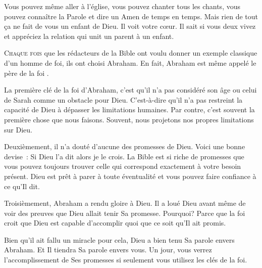 Vous pouvez même aller à l'église, vous pouvez chanter tous les chants,
 vous pouvez connaître la Parole et dire un \og Amen \fg{} de temps en temps.
 Mais rien de tout ça ne fait de vous un enfant de Dieu.
 Il voit votre c\oe{}ur. Il sait si vous deux vivez et appréciez
 la relation qui unit un parent à un enfant.

\dvrule






\lettrine{C}{haque fois} que les rédacteurs de la Bible ont voulu
 donner un exemple classique d'un homme de foi, ils ont choisi Abraham.
 En fait, Abraham est même appelé \og le père de la foi \fg{}.

La première clé de la foi d'Abraham, c'est qu'il n'a pas considéré
 son âge ou celui de Sarah comme un obstacle pour Dieu.
 C'est-à-dire qu'il n'a pas restreint la capacité de Dieu
 à dépasser les limitations humaines.
 Par contre, c'est souvent la première chose que nous faisons.
 Souvent, nous projetons nos propres limitations sur Dieu.

Deuxièmement, il n'a douté d'aucune des promesses de Dieu.
 Voici une bonne devise~: \og Si Dieu l'a dit alors je le crois. \fg{}
 La Bible est si riche de promesses que vous pouvez toujours trouver
 celle qui correspond exactement à votre besoin présent.
 Dieu est prêt à parer à toute éventualité et vous pouvez
 faire confiance à ce qu'Il dit.

Troisièmement, Abraham a rendu gloire à Dieu.
 Il a loué Dieu avant même de voir des preuves que Dieu
 allait tenir Sa promesse. Pourquoi? Parce que la foi croit
 que Dieu est capable d'accomplir quoi que ce soit qu'Il ait promis.


Bien qu'il ait fallu un miracle pour cela, Dieu a bien tenu Sa parole
 envers Abraham. Et Il tiendra Sa parole envers vous.
 Un jour, vous verrez l'accomplissement de Ses promesses
 si seulement vous utilisez les clés de la foi.

